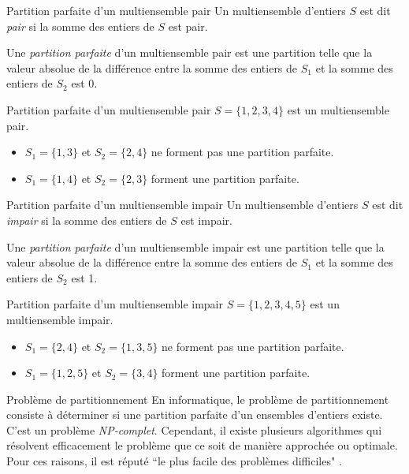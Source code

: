 \documentclass[11pt]{article}
\begin{document}
  \begin{definition}{Partition parfaite d'un multiensemble pair}
    Un multiensemble d'entiers $S$ est dit \emph{pair} si la somme des entiers de $S$ est pair.

    Une \emph{partition parfaite} d'un multiensemble pair est une partition telle que la valeur absolue de la différence entre la somme des entiers de $S_1$ et la somme des entiers de $S_2$ est 0.
  \end{definition}

  \begin{exemple}{Partition parfaite d'un multiensemble pair}
    $S = \{1,2,3,4\}$ est un multiensemble pair.
    \begin{itemize}
      \item $S_1 = \{1,3\}$ et $S_2 = \{2,4\}$ ne forment pas une partition parfaite.
      \item $S_1 = \{1,4\}$ et $S_2 = \{2,3\}$ forment une partition parfaite.
    \end{itemize}
  \end{exemple}

  \begin{definition}{Partition parfaite d'un multiensemble impair}
    Un multiensemble d'entiers $S$ est dit \emph{impair} si la somme des entiers de $S$ est impair.

    Une \emph{partition parfaite} d'un multiensemble impair est une partition telle que la valeur absolue de la différence entre la somme des entiers de $S_1$ et la somme des entiers de $S_2$ est 1.
  \end{definition}

  \begin{exemple}{Partition parfaite d'un multiensemble impair}
    $S = \{1,2,3,4, 5\}$ est un multiensemble impair.

    \begin{itemize}
      \item $S_1 = \{2, 4\}$ et $S_2 = \{1,3,5\}$ ne forment pas une partition parfaite.
      \item $S_1 = \{1, 2, 5\}$ et $S_2 = \{3,4\}$ forment une partition parfaite.
    \end{itemize}
  \end{exemple}

  \begin{definition}{Problème de partitionnement}
  En informatique, le problème de partitionnement consiste à déterminer si une partition parfaite d'un ensembles d'entiers existe. C'est un problème \emph{NP-complet}. Cependant, il existe plusieurs algorithmes qui résolvent efficacement le problème que ce soit de manière approchée ou optimale. Pour ces raisons, il est réputé ``le plus facile des problèmes difficiles" \cite{Mertens2003}.
\end{definition}
\end{document}
